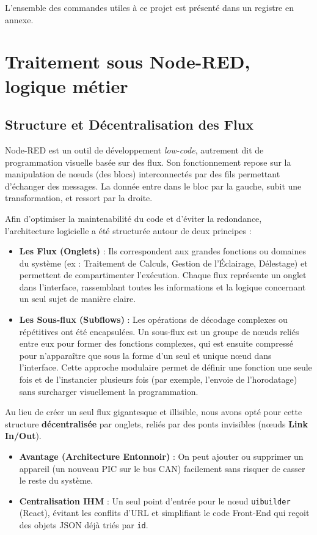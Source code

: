         L'ensemble des commandes utiles à ce projet est présenté dans un registre en annexe.

\section{Traitement sous Node-RED, logique métier}    
    \subsection{Structure et Décentralisation des Flux}

        Node-RED est un outil de développement \textit{low-code}, autrement dit de programmation visuelle basée sur des flux. Son fonctionnement repose sur la manipulation de nœuds (des blocs) interconnectés par des fils permettant d'échanger des messages. La donnée entre dans le bloc par la gauche, subit une transformation, et ressort par la droite.

        Afin d'optimiser la maintenabilité du code et d'éviter la redondance, l'architecture logicielle a été structurée autour de deux principes :
        \begin{itemize}
            \item \textbf{Les Flux (Onglets)} : Ils correspondent aux grandes fonctions ou domaines du système (ex : Traitement de Calculs, Gestion de l'Éclairage, Délestage) et permettent de compartimenter l'exécution. Chaque flux représente un onglet dans l'interface, rassemblant toutes les informations et la logique concernant un seul sujet de manière claire.
            \item \textbf{Les Sous-flux (Subflows)} : Les opérations de décodage complexes ou répétitives ont été encapsulées. Un sous-flux est un groupe de nœuds reliés entre eux pour former des fonctions complexes, qui est ensuite compressé pour n'apparaître que sous la forme d'un seul et unique nœud dans l'interface. Cette approche modulaire permet de définir une fonction une seule fois et de l'instancier plusieurs fois (par exemple, l'envoie de l'horodatage) sans surcharger visuellement la programmation.
        \end{itemize}

        Au lieu de créer un seul flux gigantesque et illisible, nous avons opté pour cette structure \textbf{décentralisée} par onglets, reliés par des ponts invisibles (nœuds \textbf{Link In/Out}).
        \begin{itemize}
            \item \textbf{Avantage (Architecture Entonnoir)} : On peut ajouter ou supprimer un appareil (un nouveau PIC sur le bus CAN) facilement sans risquer de casser le reste du système.
            \item \textbf{Centralisation IHM} : Un seul point d'entrée pour le nœud \texttt{uibuilder} (React), évitant les conflits d'URL et simplifiant le code Front-End qui reçoit des objets JSON déjà triés par \texttt{id}.
        \end{itemize}

